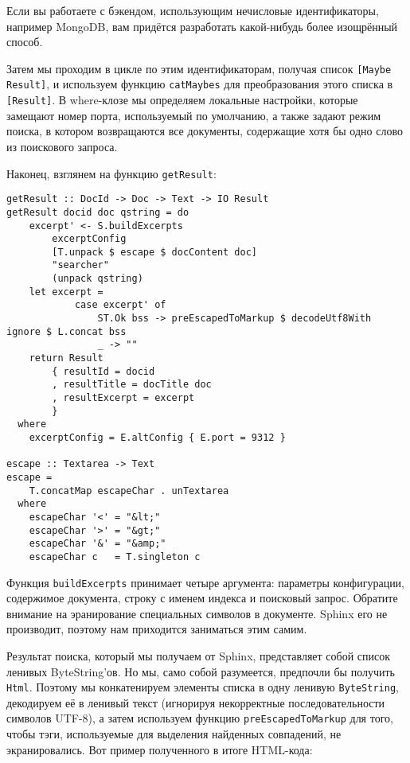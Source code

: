 \begin{remark}
  Если вы работаете с бэкендом, использующим нечисловые идентификаторы, например MongoDB, вам придётся разработать какой-нибудь более изощрённый способ.
\end{remark}

Затем мы проходим в цикле по этим идентификаторам, получая список \lstinline'[Maybe Result]', и используем функцию \lstinline'catMaybes' для преобразования этого списка в \lstinline'[Result]'. В where-клозе мы определяем локальные настройки, которые замещают номер порта, используемый по умолчанию, а также задают режим поиска, в котором возвращаются все документы, содержащие хотя бы одно слово из поискового запроса. %

Наконец, взглянем на функцию \lstinline'getResult':

\begin{lstlisting}
getResult :: DocId -> Doc -> Text -> IO Result
getResult docid doc qstring = do
    excerpt' <- S.buildExcerpts
        excerptConfig
        [T.unpack $ escape $ docContent doc]
        "searcher"
        (unpack qstring)
    let excerpt =
            case excerpt' of
                ST.Ok bss -> preEscapedToMarkup $ decodeUtf8With ignore $ L.concat bss
                _ -> ""
    return Result
        { resultId = docid
        , resultTitle = docTitle doc
        , resultExcerpt = excerpt
        }
  where
    excerptConfig = E.altConfig { E.port = 9312 }

escape :: Textarea -> Text
escape =
    T.concatMap escapeChar . unTextarea
  where
    escapeChar '<' = "&lt;"
    escapeChar '>' = "&gt;"
    escapeChar '&' = "&amp;"
    escapeChar c   = T.singleton c
\end{lstlisting}

Функция \lstinline'buildExcerpts' принимает четыре аргумента: параметры конфигурации, содержимое документа, строку с именем индекса и поисковый запрос. Обратите внимание на эранирование специальных символов в документе. Sphinx его не производит, поэтому нам приходится заниматься этим самим.

Результат поиска, который мы получаем от Sphinx, представляет собой список ленивых ByteString'ов. Но мы, само собой разумеется, предпочли бы получить \lstinline'Html'. Поэтому мы конкатенируем элементы списка в одну ленивую \lstinline'ByteString', декодируем её в ленивый текст (игнорируя некорректные последовательности символов UTF-8), а затем используем функцию \lstinline'preEscapedToMarkup' для того, чтобы тэги, используемые для выделения найденных совпадений, не экранировались. Вот пример полученного в итоге HTML-кода:

